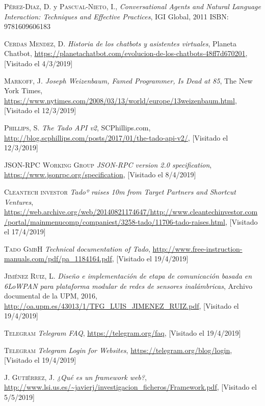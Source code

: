 \documentclass[spanish,12pt, a4paper, twoside]{paper}
\begin{document}
\newpage

\begin{thebibliography}{00}
 \textsc{Pérez-Diaz, D.} y \textsc{Pascual-Nieto, I.},
	\textit{Conversational Agents and Natural Language Interaction: Techniques and Effective Practices}, IGI Global, 2011 ISBN: 9781609606183
	
 \textsc{Cerdas Mendez, D.}
	\textit{Historia de los chatbots y asistentes virtuales}, Planeta Chatbot, \url{https://planetachatbot.com/evolucion-de-los-chatbots-48ff7d670201}, [Visitado el 4/3/2019]
	
 \textsc{Markoff, J.}
	\textit{Joseph Weizenbaum, Famed Programmer, Is Dead at 85}, The New York Times, \url{https://www.nytimes.com/2008/03/13/world/europe/13weizenbaum.html}, [Visitado el 12/3/2019]
	
 \textsc{Phillips, S.}
	\textit{The Tado API v2}, SCPhillips.com, \url{http://blog.scphillips.com/posts/2017/01/the-tado-api-v2/}, [Visitado el 12/3/2019]
	
 \textsc{JSON-RPC Working Group} \textit{JSON-RPC version 2.0 specification}, \url{https://www.jsonrpc.org/specification}, [Visitado el 8/4/2019]

 \textsc{Cleantech investor} \textit{Tadoº raises \texteuro10m from Target Partners and Shortcut Ventures}, \url{https://web.archive.org/web/20140821174647/http://www.cleantechinvestor.com/portal/mainmenucomp/companiest/3258-tado/11706-tado-raises.html}, [Visitado el 17/4/2019]

 \textsc{Tado GmbH} \textit{Technical documentation of Tado}, \url{http://www.free-instruction-manuals.com/pdf/pa_1184164.pdf}, [Visitado el 19/4/2019]

 \textsc{Jiménez Ruiz, L.} \textit{Diseño e implementación de etapa de comunicación basada en 6LoWPAN para plataforma modular de redes de sensores inalámbricas}, Archivo documental de la UPM, 2016, \url{http://oa.upm.es/43013/1/TFG_LUIS_JIMENEZ_RUIZ.pdf}, [Visitado el 19/4/2019]

 \textsc{Telegram} \textit{Telegram FAQ}, \url{https://telegram.org/faq}, [Visitado el 19/4/2019]

 \textsc{Telegram} \textit{Telegram Login for Websites}, \url{https://telegram.org/blog/login}, [Visitado el 19/4/2019]

 \textsc{J. Gutiérrez, J.} \textit{¿Qué es un framework web?}, \url{http://www.lsi.us.es/~javierj/investigacion_ficheros/Framework.pdf}, [Visitado el 5/5/2019]


\end{thebibliography}
\end{document}
